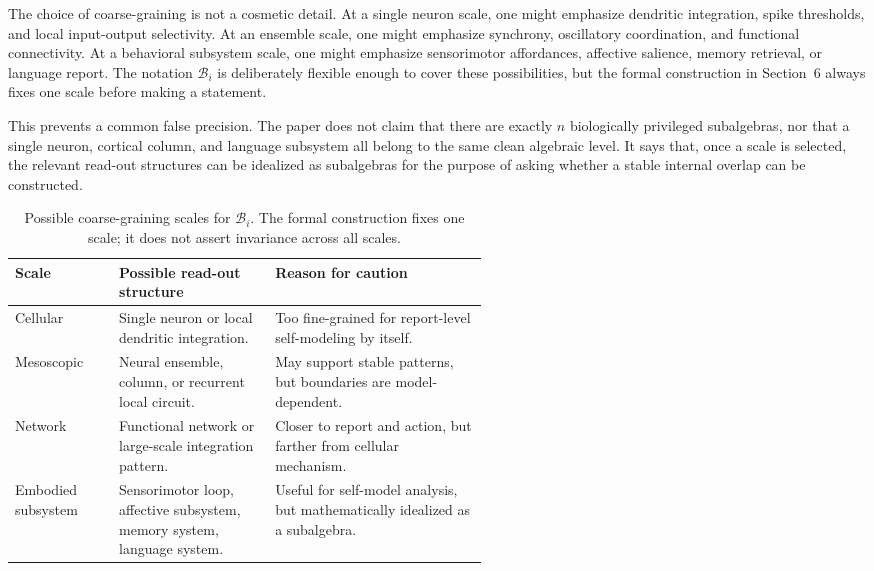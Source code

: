\documentclass[12pt]{article}
\theoremstyle{definition}
\theoremstyle{remark}
\begin{document}
The choice of coarse-graining is not a cosmetic detail. At a single
neuron scale, one might emphasize dendritic integration, spike
thresholds, and local input-output selectivity. At an ensemble scale,
one might emphasize synchrony, oscillatory coordination, and functional
connectivity. At a behavioral subsystem scale, one might emphasize
sensorimotor affordances, affective salience, memory retrieval, or
language report. The notation \(\mathcal B_i\) is deliberately flexible
enough to cover these possibilities, but the formal construction in
Section~6 always fixes one scale before making a statement.

This prevents a common false precision. The paper does not claim that
there are exactly \(n\) biologically privileged subalgebras, nor that a
single neuron, cortical column, and language subsystem all belong to the
same clean algebraic level. It says that, once a scale is selected, the
relevant read-out structures can be idealized as subalgebras for the
purpose of asking whether a stable internal overlap can be constructed.

\begin{table}[H]
\centering
\small
\begin{tabularx}{0.98\linewidth}{P{0.22\linewidth}P{0.33\linewidth}Y}
\toprule
\textbf{Scale} & \textbf{Possible read-out structure} & \textbf{Reason for caution} \\
\midrule
Cellular &
Single neuron or local dendritic integration. &
Too fine-grained for report-level self-modeling by itself. \\
Mesoscopic &
Neural ensemble, column, or recurrent local circuit. &
May support stable patterns, but boundaries are model-dependent. \\
Network &
Functional network or large-scale integration pattern. &
Closer to report and action, but farther from cellular mechanism. \\
Embodied subsystem &
Sensorimotor loop, affective subsystem, memory system, language system. &
Useful for self-model analysis, but mathematically idealized as a subalgebra. \\
\bottomrule
\end{tabularx}
\caption{Possible coarse-graining scales for \(\mathcal B_i\). The
formal construction fixes one scale; it does not assert invariance
across all scales.}
\end{table}
\end{document}
